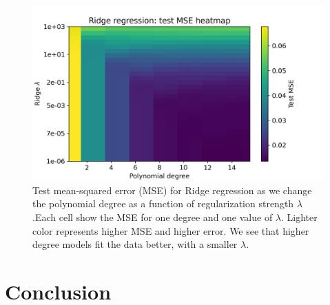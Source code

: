 \documentclass[amssymb,twocolumn,aps]{revtex4}
\begin{document}
\begin{figure}[h]
    \centering
    \includegraphics[width=1\linewidth]{Project-1/Figures/heatmap.png}
    \caption{Test mean-squared error (MSE) for Ridge regression as we change the polynomial degree as a function of regularization strength $\lambda$.Each cell show the MSE for one degree and one value of $\lambda$. Lighter color represents higher MSE and higher error. We see that higher degree models fit the data better, with a smaller $\lambda$. }
    \label{fig:heatmap}
\end{figure}


\section{Conclusion}\label{section:conclusion} 



\end{document}
